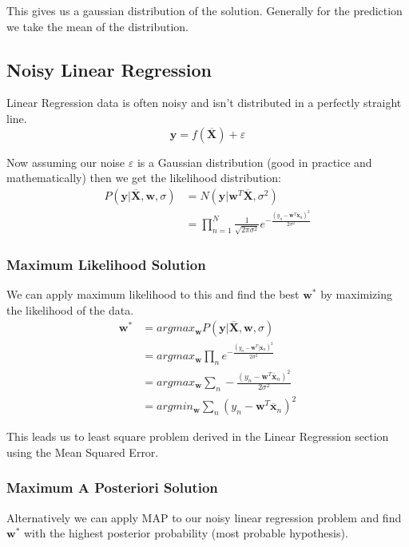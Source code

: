\documentclass[12pt]{article}
\begin{document}
            This gives us a gaussian distribution of the solution. Generally for the prediction we take the mean of the distribution. 
    
    \subsection{Noisy Linear Regression}
        Linear Regression data is often noisy and isn't distributed in a perfectly straight line. 
        $$ \boldsymbol{y} = f(\overline{\boldsymbol{X}}) + \varepsilon $$

        Now assuming our noise $\varepsilon$ is a Gaussian distribution (good in practice and mathematically) then we get the likelihood distribution:
        \begin{align*}
            P(\boldsymbol{y}|\overline{\boldsymbol{X}},\boldsymbol{w}, \sigma) &= N(\boldsymbol{y}|\boldsymbol{w}^T\overline{\boldsymbol{X}}, \sigma^2) \\
            &= \prod_{n=1}^N \frac{1}{\sqrt{2\pi\sigma^2}}e^{-\frac{(y_n - \boldsymbol{w}^T \overline{\boldsymbol{x}}_n)^2}{2\sigma^2}}
        \end{align*}
        
        \subsubsection{Maximum Likelihood Solution}
            We can apply maximum likelihood to this and find the best $\boldsymbol{w}^*$ by maximizing the likelihood of the data.
            \begin{align*}
                \boldsymbol{w^*} &= argmax_{\boldsymbol{w}} P(\boldsymbol{y}|\overline{\boldsymbol{X}}, \boldsymbol{w}, \sigma) \\
                &= argmax_{\boldsymbol{w}} \prod_{n} e^{-\frac{(y_n - \boldsymbol{w}^T] \overline{\boldsymbol{x}}_n)^2}{2\sigma^2}} \\
                &= argmax_{\boldsymbol{w}} \sum_{n} -\frac{(y_n - \boldsymbol{w}^T \overline{\boldsymbol{x}}_n)^2}{2\sigma^2} \\
                &= argmin_{\boldsymbol{w}} \sum_{n} (y_n - \boldsymbol{w}^T \overline{\boldsymbol{x}}_n)^2
            \end{align*}

            This leads us to least square problem derived in the Linear Regression section using the Mean Squared Error.

        \subsubsection{Maximum A Posteriori Solution}
            Alternatively we can apply MAP to our noisy linear regression problem and find $\boldsymbol{w}^*$ with the highest posterior probability (most probable hypothesis).
            
\end{document}
